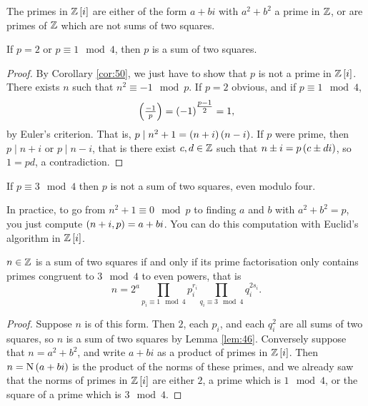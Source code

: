 \pagebreak

\begin{corollary}
\label{cor:50}
The primes in $ \ZZ\sbr{i} $ are either of the form $ a + bi $ with $ a^2 + b^2 $ a prime in $ \mathbb{Z} $, or are primes of $ \mathbb{Z} $ which are not sums of two squares.
\end{corollary}

\begin{theorem}
If $ p = 2 $ or $ p \equiv 1 \mod 4 $, then $ p $ is a sum of two squares.
\end{theorem}

\begin{proof}
By Corollary \ref{cor:50}, we just have to show that $ p $ is not a prime in $ \ZZ\sbr{i} $. There exists $ n $ such that $ n^2 \equiv -1 \mod p $. If $ p = 2 $ obvious, and if $ p \equiv 1 \mod 4 $,
$$ \jacobi{-1}{p} = \br{-1}^{\tfrac{p - 1}{2}} = 1, $$
by Euler's criterion. That is, $ p \mid n^2 + 1 = \br{n + i}\br{n - i} $. If $ p $ were prime, then $ p \mid n + i $ or $ p \mid n - i $, that is there exist $ c, d \in \mathbb{Z} $ such that $ n \pm i = p\br{c \pm di} $, so $ 1 = pd $, a contradiction.
\end{proof}

\begin{remark*}
If $ p \equiv 3 \mod 4 $ then $ p $ is not a sum of two squares, even modulo four.
\end{remark*}

\begin{remark*}
In practice, to go from $ n^2 + 1 \equiv 0 \mod p $ to finding $ a $ and $ b $ with $ a^2 + b^2 = p $, you just compute $ \br{n + i, p} = a + bi $. You can do this computation with Euclid's algorithm in $ \ZZ\sbr{i} $.
\end{remark*}

\begin{theorem}
$ n \in \mathbb{Z} $ is a sum of two squares if and only if its prime factorisation only contains primes congruent to $ 3 \mod 4 $ to even powers, that is
$$ n = 2^a\prod_{p_i \equiv 1 \mod 4} p_i^{r_i}\prod_{q_i \equiv 3 \mod 4} q_i^{2s_i}. $$
\end{theorem}

\begin{proof}
Suppose $ n $ is of this form. Then $ 2 $, each $ p_i $, and each $ q_i^2 $ are all sums of two squares, so $ n $ is a sum of two squares by Lemma \ref{lem:46}. Conversely suppose that $ n = a^2 + b^2 $, and write $ a + bi $ as a product of primes in $ \ZZ\sbr{i} $. Then $ n = \N\br{a + bi} $ is the product of the norms of these primes, and we already saw that the norms of primes in $ \ZZ\sbr{i} $ are either $ 2 $, a prime which is $ 1 \mod 4 $, or the square of a prime which is $ 3 \mod 4 $.
\end{proof}

